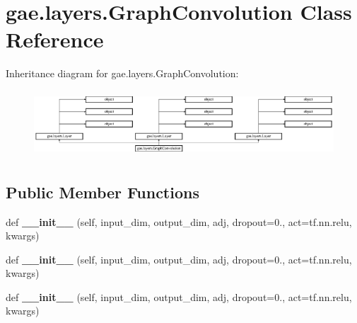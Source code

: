 \hypertarget{classgae_1_1layers_1_1GraphConvolution}{}\section{gae.\+layers.\+Graph\+Convolution Class Reference}
\label{classgae_1_1layers_1_1GraphConvolution}
Inheritance diagram for gae.\+layers.\+Graph\+Convolution\+:\begin{figure}[H]
\begin{center}
\leavevmode
\includegraphics[height=2.508961cm]{classgae_1_1layers_1_1GraphConvolution}
\end{center}
\end{figure}
\subsection*{Public Member Functions}
\begin{DoxyCompactItemize}
\item 
\mbox{\label{classgae_1_1layers_1_1GraphConvolution_ae7919fc426f8afbef736d1e48847b2fd}} 
def {\bfseries \+\_\+\+\_\+init\+\_\+\+\_\+} (self, input\+\_\+dim, output\+\_\+dim, adj, dropout=0., act=tf.\+nn.\+relu, kwargs)
\item 
\mbox{\label{classgae_1_1layers_1_1GraphConvolution_ae7919fc426f8afbef736d1e48847b2fd}} 
def {\bfseries \+\_\+\+\_\+init\+\_\+\+\_\+} (self, input\+\_\+dim, output\+\_\+dim, adj, dropout=0., act=tf.\+nn.\+relu, kwargs)
\item 
\mbox{\label{classgae_1_1layers_1_1GraphConvolution_ae7919fc426f8afbef736d1e48847b2fd}} 
def {\bfseries \+\_\+\+\_\+init\+\_\+\+\_\+} (self, input\+\_\+dim, output\+\_\+dim, adj, dropout=0., act=tf.\+nn.\+relu, kwargs)
\end{DoxyCompactItemize}
